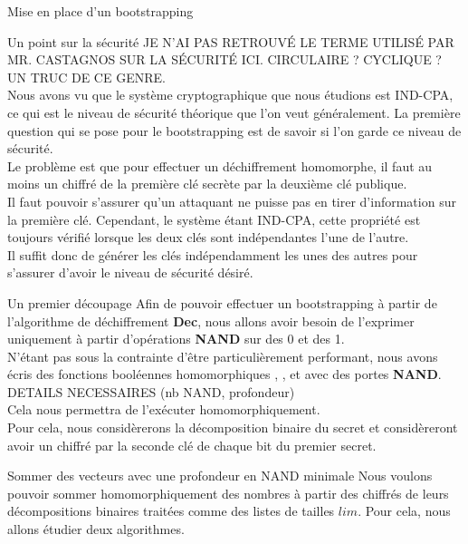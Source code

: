 \begin{section}{Mise en place d'un bootstrapping}
\begin{subsection}{Un point sur la sécurité}
JE N'AI PAS RETROUVÉ LE TERME UTILISÉ PAR MR. CASTAGNOS SUR LA SÉCURITÉ ICI.
CIRCULAIRE ? CYCLIQUE ? UN TRUC DE CE GENRE.\\
Nous avons vu que le système cryptographique que nous étudions est IND-CPA, ce qui est le niveau de sécurité théorique que l'on veut généralement. La première question qui se pose pour le bootstrapping est de savoir si l'on garde ce niveau de sécurité.\\
Le problème est que pour effectuer un déchiffrement homomorphe, il faut au moins un chiffré de la première clé secrète par la deuxième clé publique. \\
Il faut pouvoir s'assurer qu'un attaquant ne puisse pas en tirer d'information sur la première clé. Cependant, le système étant IND-CPA, cette propriété est toujours vérifié lorsque les deux clés sont indépendantes l'une de l'autre. \\
Il suffit donc de générer les clés indépendamment les unes des autres pour s'assurer d'avoir le niveau de sécurité désiré.
\end{subsection}
\begin{subsection}{Un premier découpage}
Afin de pouvoir effectuer un bootstrapping à partir de l'algorithme de déchiffrement \textbf{Dec}, nous allons avoir besoin de l'exprimer uniquement à partir d'opérations \textbf{NAND} sur des 0 et des 1. \\
N'étant pas sous la contrainte d'être particulièrement performant, nous avons écris des fonctions booléennes homomorphiques , ,  et  avec des portes \textbf{NAND}. \\ DETAILS NECESSAIRES (nb NAND, profondeur) \\
Cela nous permettra de l'exécuter homomorphiquement. \\
Pour cela, nous considèrerons la décomposition binaire du secret et considèreront avoir un chiffré par la seconde clé de chaque bit du premier secret.
\end{subsection}
\begin{subsection}{Sommer des vecteurs avec une profondeur en NAND minimale}
Nous voulons pouvoir sommer homomorphiquement des nombres à partir des chiffrés de leurs décompositions binaires traitées comme des listes de tailles $lim$. Pour cela, nous allons étudier deux algorithmes. \\


\end{subsection}
\end{section}
